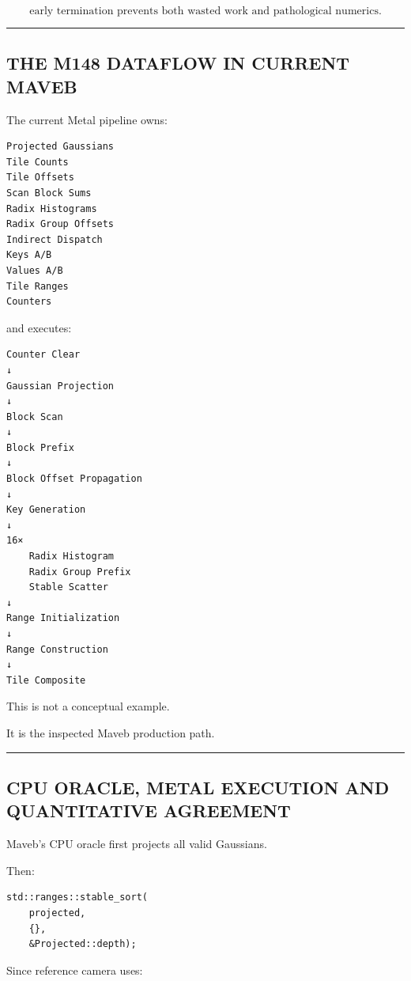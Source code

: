 \[
\boxed{
\text{early termination prevents both wasted work and pathological numerics}.
}
\]

\begin{center}\rule{0.5\linewidth}{0.5pt}\end{center}

\subsection{THE M148 DATAFLOW IN CURRENT MAVEB}\label{04-visual-computing-ii-ch039-the-m148-dataflow-in-current-maveb}

The current Metal pipeline owns:

\protect{}\label{f7zvxr}%
\begin{verbatim}
Projected Gaussians
Tile Counts
Tile Offsets
Scan Block Sums
Radix Histograms
Radix Group Offsets
Indirect Dispatch
Keys A/B
Values A/B
Tile Ranges
Counters
\end{verbatim}

and executes:

\protect{}\label{1ly8ek}%
\begin{verbatim}
Counter Clear
↓
Gaussian Projection
↓
Block Scan
↓
Block Prefix
↓
Block Offset Propagation
↓
Key Generation
↓
16×
    Radix Histogram
    Radix Group Prefix
    Stable Scatter
↓
Range Initialization
↓
Range Construction
↓
Tile Composite
\end{verbatim}

This is not a conceptual example.

It is the inspected Maveb production path.

\begin{center}\rule{0.5\linewidth}{0.5pt}\end{center}

\subsection{CPU ORACLE, METAL EXECUTION AND QUANTITATIVE AGREEMENT}\label{04-visual-computing-ii-ch039-cpu-oracle-metal-execution-and-quantitative-agreement}

Maveb's CPU oracle first projects all valid Gaussians.

Then:

\begin{verbatim}
std::ranges::stable_sort(
    projected,
    {},
    &Projected::depth);
\end{verbatim}

Since reference camera uses:

